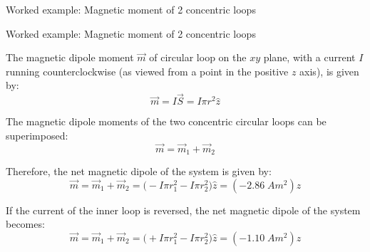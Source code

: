 {\begin{frame}{Worked example: Magnetic moment of 2 concentric loops}
\end{frame}

%
%
%

\begin{frame}{Worked example: Magnetic moment of 2 concentric loops}

  The magnetic dipole moment $\vec{m}$ of circular loop on the $xy$
  plane, with a current $I$ running counterclockwise (as viewed
  from a point in the positive $z$ axis), is given by:
  \begin{equation*}
    \vec{m} = I \vec{S} = I \pi r^2 \hat{z}
  \end{equation*}

  The magnetic dipole moments of the two concentric circular loops
  can be superimposed:
  \begin{equation*}
    \vec{m} = \vec{m}_1 + \vec{m}_2
  \end{equation*}

  Therefore, the net magnetic dipole of the system
  is given by:
  \begin{equation*}
    \vec{m} = \vec{m}_1 + \vec{m}_2
            = \Big(-I \pi r^2_1 - I \pi r^2_2 \Big) \hat{z}
            = (-2.86 \; A m^2) \hat{z}
  \end{equation*}

  If the current of the inner loop is reversed,
  the net magnetic dipole of the system becomes:
  \begin{equation*}
    \vec{m} = \vec{m}_1 + \vec{m}_2
            = \Big(+I \pi r^2_1 - I \pi r^2_2 \Big) \hat{z}
            = (-1.10 \; A m^2) \hat{z}
  \end{equation*}

\end{frame}


} %

